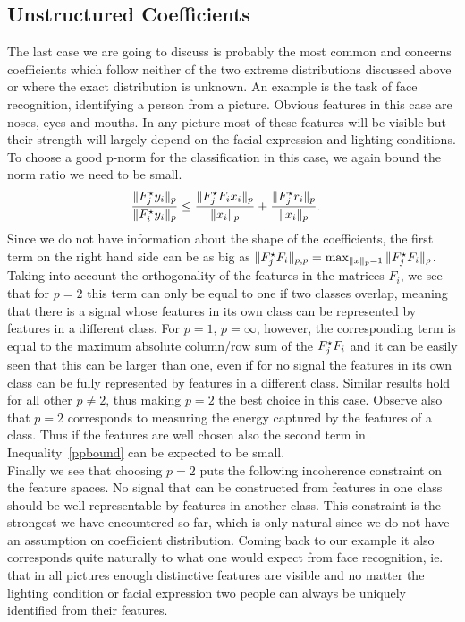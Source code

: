 \documentclass[11pt]{article}
\begin{document}
\subsection{Unstructured Coefficients}
The last case we are going to discuss is probably the most common and concerns coefficients which follow neither of the two extreme distributions discussed above or where the exact distribution is unknown. An example is the task of face recognition, \ie identifying a person from a picture. Obvious features in this case are noses, eyes and mouths. In any picture most of these features will be visible but their strength will largely depend on the facial expression and lighting conditions. To choose a good p-norm for the classification in this case, we again bound the norm ratio we need to be small.
\begin{align}\label{ppbound}
\frac{\|{F}_j^\star {y}_i\|_p}{\|{F}^\star_i{y}_i\|_p} &\leq \frac{\|{F}_j^\star {F}_i
x_i\|_p}{\|x_i\|_p} +  \frac{\| {F}_j^\star r_i\|_p}{\| x_i\|_p}.
\end{align}
Since we do not have information about the shape of the coefficients, the first term on the right hand side can be as big as $\|{F}_j^\star {F}_i \|_{p,p}=\max_{\|x\|_p=1} \|{F}_j^\star {F}_i \|_{p}$. Taking into account the orthogonality of the features in the matrices $F_i$, we see that for $p=2$ this term can only be equal to one if two classes overlap, meaning that there is a signal whose features in its own class can be represented by features in a different class. For $p=1,\, p=\infty$, however, the corresponding term is equal to the maximum absolute column/row sum of the ${F}_j^\star {F}_i$ and it can be easily seen that this can be larger than one, even if for no signal the features in its own class can be fully represented by features in a different class. Similar results hold for all other $p\neq 2$, thus making $p=2$ the best choice in this case. Observe also that $p=2$ corresponds to measuring the energy captured by the features of a class. Thus if the features are well chosen also the second term in Inequality~\eqref{ppbound} can be expected to be small.\\
Finally we see that choosing $p=2$ puts the following incoherence constraint on the feature spaces.  No signal that can be constructed from features in one class should be well representable by features in another class. This constraint is the strongest we have encountered so far, which is only natural since we do not have an assumption on coefficient distribution. Coming back to our example it also corresponds quite naturally to what one would expect from face recognition, ie. that in all pictures enough distinctive features are visible and no matter the lighting condition or facial expression two people can always be uniquely identified from their features.\\
\end{document}
